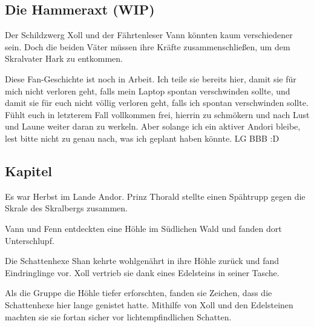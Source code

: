 \begin{chapterbox}
    \chapter{Die Hammeraxt (WIP)}
    \label{wip-die-hammeraxt}

    Der Schildzwerg Xoll und der Fährtenleser Vann könnten kaum verschiedener sein. Doch die beiden Väter müssen ihre Kräfte zusammenschließen, um dem Skralvater Hark zu entkommen.
\end{chapterbox}



Diese Fan-Geschichte ist noch in Arbeit. Ich teile sie bereits hier, damit sie für mich nicht verloren geht, falls mein Laptop spontan verschwinden sollte, und damit sie für euch nicht völlig verloren geht, falls ich spontan verschwinden sollte. Fühlt euch in letzterem Fall vollkommen frei, hierrin zu schmökern und nach Lust und Laune weiter daran zu werkeln. Aber solange ich ein aktiver Andori bleibe, lest bitte nicht zu genau nach, was ich geplant haben könnte. LG BBB :D



\newpage
\section{Kapitel}

Es war Herbst im Lande Andor. Prinz Thorald stellte einen Spähtrupp gegen die Skrale des Skralbergs zusammen.



Vann und Fenn entdeckten eine Höhle im Südlichen Wald und fanden dort Unterschlupf.

Die Schattenhexe Shan kehrte wohlgenährt in ihre Höhle zurück und fand Eindringlinge vor. Xoll vertrieb sie dank eines Edelsteins in seiner Tasche. 

Als die Gruppe die Höhle tiefer erforschten, fanden sie Zeichen, dass die Schattenhexe hier lange genistet hatte. Mithilfe von Xoll und den Edelsteinen machten sie sie fortan sicher vor lichtempfindlichen Schatten.

